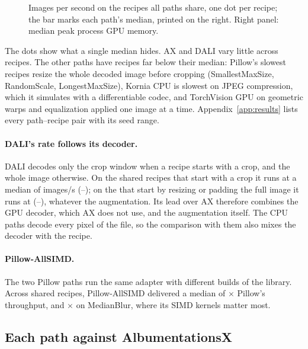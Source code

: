 \documentclass[11pt]{article}
\begin{document}
\begin{figure}[H]
\centering

\caption{Images per second on the \CommonRecipeCount{} recipes all paths share, one dot per
recipe; the bar marks each path's median, printed on the right. Right panel: median peak
process GPU memory.}
\label{fig:overview}
\end{figure}

The dots show what a single median hides. AX and DALI vary little across recipes. The other paths
have recipes far below their median: Pillow's slowest recipes resize the whole decoded image
before cropping (SmallestMaxSize, RandomScale, LongestMaxSize), Kornia CPU is slowest on JPEG
compression, which it simulates with a differentiable codec, and TorchVision GPU on geometric
warps and equalization applied one image at a time. Appendix~\ref{app:results} lists every
path--recipe pair with its seed range.

\paragraph{DALI's rate follows its decoder.} DALI decodes only the crop window when a recipe starts
with a crop, and the whole image otherwise. On the \DALIWindowRecipes{} shared recipes that start with a
crop it runs at a median of \DALIWindowMedian{} images/s (\DALIWindowLow{}--\DALIWindowHigh{}); on the
\DALIFullRecipes{} that start by resizing or padding the full image it runs at \DALIFullMedian{}
(\DALIFullLow{}--\DALIFullHigh{}), whatever the augmentation. Its lead over AX therefore combines the
GPU decoder, which AX does not use, and the augmentation itself. The CPU paths decode every pixel of the
file, so the comparison with them also mixes the decoder with the recipe.

\paragraph{Pillow-AllSIMD.} The two Pillow paths run the same adapter with different builds of
the library. Across \AllSIMDShared{} shared recipes, Pillow-AllSIMD delivered a median of
\AllSIMDMedianRatio\(\times\) Pillow's throughput, and \AllSIMDMedianBlurRatio\(\times\) on
MedianBlur, where its SIMD kernels matter most.

\subsection{Each path against AlbumentationsX}
\end{document}
